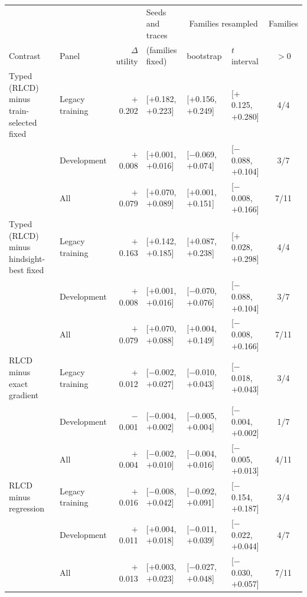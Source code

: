 \begin{tabular}{llrlllc}
\toprule
 & & & Seeds and traces & \multicolumn{2}{c}{Families resampled} & Families \\
Contrast & Panel & $\Delta$ utility & (families fixed) & bootstrap & $t$ interval & $>0$ \\
\midrule
Typed (RLCD) minus train-selected fixed & Legacy training & $+$0.202 & [$+$0.182, $+$0.223] & [$+$0.156, $+$0.249] & [$+$0.125, $+$0.280] & 4/4 \\
 & Development & $+$0.008 & [$+$0.001, $+$0.016] & [$-$0.069, $+$0.074] & [$-$0.088, $+$0.104] & 3/7 \\
 & All & $+$0.079 & [$+$0.070, $+$0.089] & [$+$0.001, $+$0.151] & [$-$0.008, $+$0.166] & 7/11 \\
\midrule
Typed (RLCD) minus hindsight-best fixed & Legacy training & $+$0.163 & [$+$0.142, $+$0.185] & [$+$0.087, $+$0.238] & [$+$0.028, $+$0.298] & 4/4 \\
 & Development & $+$0.008 & [$+$0.001, $+$0.016] & [$-$0.070, $+$0.076] & [$-$0.088, $+$0.104] & 3/7 \\
 & All & $+$0.079 & [$+$0.070, $+$0.088] & [$+$0.004, $+$0.149] & [$-$0.008, $+$0.166] & 7/11 \\
\midrule
RLCD minus exact gradient & Legacy training & $+$0.012 & [$-$0.002, $+$0.027] & [$-$0.010, $+$0.043] & [$-$0.018, $+$0.043] & 3/4 \\
 & Development & $-$0.001 & [$-$0.004, $+$0.002] & [$-$0.005, $+$0.004] & [$-$0.004, $+$0.002] & 1/7 \\
 & All & $+$0.004 & [$-$0.002, $+$0.010] & [$-$0.004, $+$0.016] & [$-$0.005, $+$0.013] & 4/11 \\
\midrule
RLCD minus regression & Legacy training & $+$0.016 & [$-$0.008, $+$0.042] & [$-$0.092, $+$0.091] & [$-$0.154, $+$0.187] & 3/4 \\
 & Development & $+$0.011 & [$+$0.004, $+$0.018] & [$-$0.011, $+$0.039] & [$-$0.022, $+$0.044] & 4/7 \\
 & All & $+$0.013 & [$+$0.003, $+$0.023] & [$-$0.027, $+$0.048] & [$-$0.030, $+$0.057] & 7/11 \\
\bottomrule
\end{tabular}
